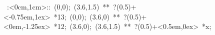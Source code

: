 \hbox{
\xy    <1cm,0cm>:<0cm,1cm>::
       (0,0); (3.6,1.5) **\dir{-}  ?(0.5)+<-0.75em,1ex> *{13};
       (0,0); (3.6,0) **\dir{-}  ?(0.5)+<0em,-1.25ex> *{12};
       (3.6,0); (3.6,1.5) **\dir{-}    ?(0.5)+<0.5em,0ex> *{x};
       \endxy}
